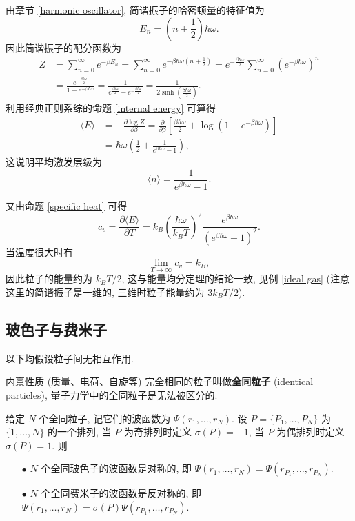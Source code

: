 \begin{example}[简谐振子]
    由章节 \ref{harmonic oscillator}, 简谐振子的哈密顿量的特征值为
    \[ E_n=\left( n+\frac{1}{2} \right)\hbar\omega. \]
    因此简谐振子的配分函数为
    \begin{align*}
        Z&=\sum_{n=0}^{\infty}e^{-\beta E_n}=\sum_{n=0}^{\infty}e^{-\beta\hbar\omega\left( n+\frac{1}{2} \right)}=e^{-\frac{\beta\hbar\omega}{2}}\sum_{n=0}^{\infty}\left( e^{-\beta\hbar\omega} \right)^n\\
        &=\frac{e^{-\frac{\beta\hbar\omega}{2}}}{1-e^{-\beta\hbar\omega}}=\frac{1}{e^{\frac{\beta\hbar\omega}{2}}-e^{-\frac{\beta\hbar\omega}{2}}}=\frac{1}{2\sinh\left( \frac{\beta\hbar\omega}{2} \right)}.
    \end{align*}
    利用经典正则系综的命题 \ref{internal energy} 可算得
    \begin{align*}
        \langle E\rangle &= -\frac{\partial\log Z}{\partial\beta}=\frac{\partial}{\partial\beta}\left[ \frac{\beta\hbar\omega}{2}+\log\left( 1-e^{-\beta\hbar\omega} \right) \right]\\ 
        &=\hbar\omega\left( \frac{1}{2}+\frac{1}{e^{\beta\hbar\omega}-1} \right),
    \end{align*}
    这说明平均激发层级为
    \[ \langle n\rangle=\frac{1}{e^{\beta\hbar\omega}-1}. \]
    
    又由命题 \ref{specific heat} 可得
    \[ c_v=\frac{\partial \langle E\rangle}{\partial T}=k_B\left( \frac{\hbar\omega}{k_B T} \right)^2\frac{e^{\beta\hbar\omega}}{\left( e^{\beta\hbar\omega}-1 \right)^2}. \]
    当温度很大时有
    \[ \lim_{T\to\infty}c_v=k_B, \]
    因此粒子的能量约为 $ k_BT/2 $, 这与能量均分定理的结论一致, 见例 \ref{ideal gas} (注意这里的简谐振子是一维的, 三维时粒子能量约为 $ 3k_BT/2 $).
\end{example}
\subsection{玻色子与费米子}
以下均假设粒子间无相互作用.
\begin{quantumaxiom}[全同粒子假设]
    内禀性质 (质量、电荷、自旋等) 完全相同的粒子叫做{\bf 全同粒子} (identical particles), 量子力学中的全同粒子是无法被区分的.
\end{quantumaxiom}

给定 $ N $ 个全同粒子, 记它们的波函数为 $ \Psi(r_1,\dots,r_N) $. 设 $ P=\{P_1,\dots,P_N\} $ 为 $ \{1,\dots,N\} $ 的一个排列, 当 $ P $ 为奇排列时定义 $ \sigma(P)=-1 $, 当 $ P $ 为偶排列时定义 $ \sigma(P)=1 $. 则
\begin{enumerate}
    \item[$ \bullet $] $ N $ 个全同玻色子的波函数是对称的, 即 $ \Psi(r_1,\dots,r_N)=\Psi(r_{P_1},\dots,r_{P_N}) $.
    \item[$ \bullet $] $ N $ 个全同费米子的波函数是反对称的, 即 $ \Psi(r_1,\dots,r_N)=\sigma(P)\Psi(r_{P_1},\dots,r_{P_N}) $.
\end{enumerate}

